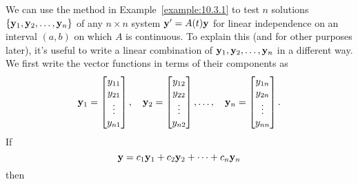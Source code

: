 \documentclass{ximera}
\begin{document}
We can use the method in
 Example~\ref{example:10.3.1}  to test
$n$ solutions $\{{\bf y}_1,{\bf y}_2,\dots,{\bf y}_n\}$ of any
$n\times n$ system
${\bf y}'=A(t){\bf y}$  for linear independence on an interval $(a,b)$
on which $A$ is continuous.  To explain this (and for other purposes
later), it's useful to write a linear combination of
${\bf y}_1, {\bf y}_2, \dots, {\bf y}_n$ in a different way. We first
write the vector functions in terms of their components as
$$
{\bf y}_1=\begin{bmatrix} y_{11}\\y_{21}\\ \vdots\\
y_{n1}\end{bmatrix},\quad
{\bf y}_2=\begin{bmatrix} y_{12}\\y_{22}\\ \vdots\\
y_{n2}\end{bmatrix},\dots,\quad
{\bf y}_n=\begin{bmatrix} y_{1n}\\y_{2n}\\ \vdots\\
y_{nn}\end{bmatrix}.
$$
If
$$
{\bf y}=c_1{\bf y}_1+c_2{\bf y}_2+\cdots+c_n{\bf y}_n
$$
then
\end{document}
